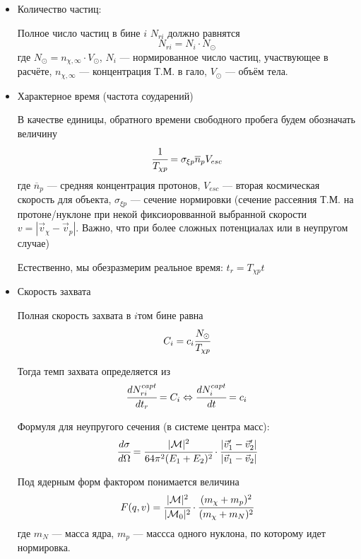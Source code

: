 	
	\begin{itemize}
		\item Количество частиц:
		
		Полное число частиц в бине $i$ $N_{ri}$ должно равнятся
		\begin{equation*}
			N_{ri} = N_i \cdot N_{\odot}
		\end{equation*}
		где $N_{\odot} = n_{\chi,\infty}\cdot V_{\odot}$,  $N_i$ --- нормированное число частиц, участвующее в расчёте, $n_{\chi,\infty}$ --- концентрация Т.М. в гало, $V_{\odot}$ --- объём тела.
		\item Характерное время (частота соударений)
		
		В качестве единицы, обратного времени свободного пробега будем обозначать величину
		\begin{equation*}
			\cfrac{1}{T_{\chi p}} = 
			\sigma_{\xi p} \overline{n}_p V_{esc}
		\end{equation*}
		где $\overline{n}_p$ --- средняя концентрация протонов, $V_{esc}$ --- вторая космическая скорость для объекта, $\sigma_{\xi p}$ --- сечение нормировки (сечение рассеяния Т.М. на протоне/нуклоне при некой фиксиоровванной выбранной скорости $v = |\vec{v}_{\chi} - \vec{v}_p|$. Важно, что при более сложных потенциалах или в неупругом случае) 
		
		Естественно, мы обезразмерим реальное время: $t_r = T_{\chi p} t$
		\item Скорость захвата
		
		Полная скорость захвата в $i$том бине равна
		\begin{equation*}
			C_i = c_i \cfrac{N_{\odot}}{T_{\chi p}} 
		\end{equation*}
		
		Тогда темп захвата определяется из
		\begin{equation*}
			\cfrac{dN_{ri}^{capt}}{dt_r} = C_i \Leftrightarrow \cfrac{d N_{i}^{capt}}{dt} = c_i
		\end{equation*}
		
		Формуля для неупругого сечения (в системе центра масс):
		\begin{equation*}
			\cfrac{d\sigma}{d\Omega} = \cfrac{|\mathcal{M}|^2}{64\pi^2(E_1+E_2)^2}\cdot \cfrac{|\vec{v}_1'-\vec{v}_2'|}{|\vec{v}_1-\vec{v}_2|}
		\end{equation*}
		
		Под ядерным форм фактором понимается величина
		\begin{equation*}
			F(q,v) = \cfrac{|\mathcal{M}|^2}{|\mathcal{M}_0|^2} \cdot \cfrac{(m_{\chi}+m_{p})^2}{(m_{\chi}+m_{N})^2}
		\end{equation*}
		где $m_{N}$ --- масса ядра, $m_{p}$ --- массса одного нуклона, по которому идет нормировка.
		

\end{itemize}
